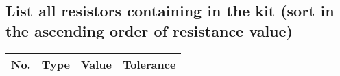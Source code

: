 \subsection{List all resistors containing in the kit (sort in the ascending order of resistance value)}
\begin{table}[ht]
	\centering
	\begin{tabular}{p{0.1cm}|c|c|c}
		No. & Type & Value & Tolerance \\ \hline
	\end{tabular}
\end{table}